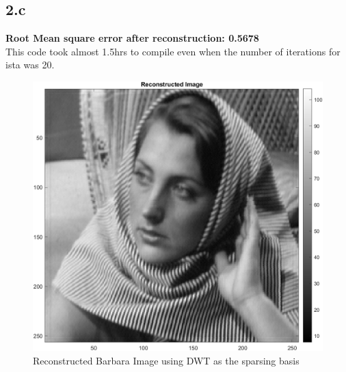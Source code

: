 \documentclass[12pt]{article}
\begin{document}
\subsection*{2.c}
\textbf{Root Mean square error after reconstruction: 0.5678}\\
This code took almost 1.5hrs to compile even when the number of iterations for ista was 20.
\begin{figure}[H]
  \centering
  \includegraphics[scale=0.4]{rec_dwt.png}  %
  \caption{Reconstructed Barbara Image using DWT as the sparsing basis}
  \label{fig:4}
\end{figure}
\end{document}
